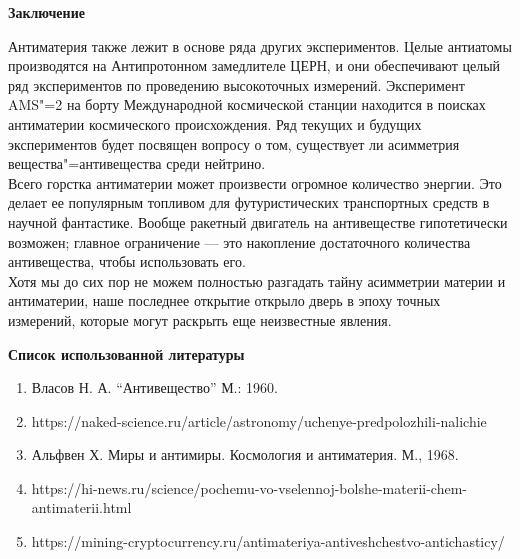 \begin{flushleft}
\newpage
\textbf{Заключение}
\vspace*{14pt}

Антиматерия также лежит в основе ряда других экспериментов. Целые антиатомы производятся 
на Антипротонном замедлителе ЦЕРН, и они обеспечивают целый ряд экспериментов по проведению 
высокоточных измерений. Эксперимент AMS"=2 на борту Международной космической станции находится 
в поисках антиматерии космического происхождения. Ряд текущих и будущих экспериментов будет 
посвящен вопросу о том, существует ли асимметрия вещества"=антивещества среди нейтрино. \\
Всего горстка антиматерии может произвести огромное количество энергии. Это делает ее популярным 
топливом для футуристических транспортных средств в научной фантастике. Вообще ракетный двигатель 
на антивеществе гипотетически возможен; главное ограничение — это накопление достаточного количества 
антивещества, чтобы использовать его.\\

Хотя мы до сих пор не можем полностью разгадать тайну асимметрии материи и антиматерии, 
наше последнее открытие открыло дверь в эпоху точных измерений, которые могут раскрыть еще 
неизвестные явления.

\newpage
\textbf{Список использованной литературы}
\vspace*{14pt}

\begin{enumerate}
    \item Власов Н. А. “Антивещество” М.: 1960.
    \item https://naked-science.ru/article/astronomy/uchenye-predpolozhili-nalichie
    \item Альфвен Х. Миры и антимиры. Космология и антиматерия. М., 1968.
    \item https://hi-news.ru/science/pochemu-vo-vselennoj-bolshe-materii-chem-antimaterii.html
    \item https://mining-cryptocurrency.ru/antimateriya-antiveshchestvo-antichasticy/
\end{enumerate}
\end{flushleft}
